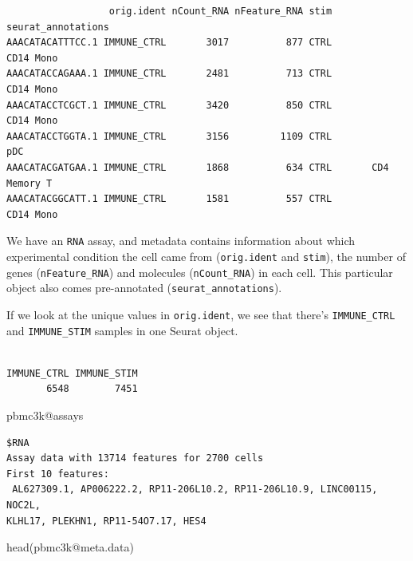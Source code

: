 \documentclass[
  letterpaper,
  DIV=11,
  numbers=noendperiod]{scrreprt}
\newenvironment{Shaded}{\begin{snugshade}}{\end{snugshade}}
\newcommand{\FunctionTok}[1]{\textcolor[rgb]{0.28,0.35,0.67}{#1}}
\newcommand{\NormalTok}[1]{\textcolor[rgb]{0.00,0.23,0.31}{#1}}
\newcommand{\SpecialCharTok}[1]{\textcolor[rgb]{0.37,0.37,0.37}{#1}}
\begin{document}
\begin{verbatim}
                  orig.ident nCount_RNA nFeature_RNA stim seurat_annotations
AAACATACATTTCC.1 IMMUNE_CTRL       3017          877 CTRL          CD14 Mono
AAACATACCAGAAA.1 IMMUNE_CTRL       2481          713 CTRL          CD14 Mono
AAACATACCTCGCT.1 IMMUNE_CTRL       3420          850 CTRL          CD14 Mono
AAACATACCTGGTA.1 IMMUNE_CTRL       3156         1109 CTRL                pDC
AAACATACGATGAA.1 IMMUNE_CTRL       1868          634 CTRL       CD4 Memory T
AAACATACGGCATT.1 IMMUNE_CTRL       1581          557 CTRL          CD14 Mono
\end{verbatim}

We have an \texttt{RNA} assay, and metadata contains information about
which experimental condition the cell came from (\texttt{orig.ident} and
\texttt{stim}), the number of genes (\texttt{nFeature\_RNA}) and
molecules (\texttt{nCount\_RNA}) in each cell. This particular object
also comes pre-annotated (\texttt{seurat\_annotations}).

If we look at the unique values in \texttt{orig.ident}, we see that
there's \texttt{IMMUNE\_CTRL} and \texttt{IMMUNE\_STIM} samples in one
Seurat object.

\begin{Shaded}
\end{Shaded}

\begin{verbatim}

IMMUNE_CTRL IMMUNE_STIM 
       6548        7451 
\end{verbatim}

\begin{Shaded}
\begin{Highlighting}[]
\NormalTok{pbmc3k}\SpecialCharTok{@}\NormalTok{assays}
\end{Highlighting}
\end{Shaded}

\begin{verbatim}
$RNA
Assay data with 13714 features for 2700 cells
First 10 features:
 AL627309.1, AP006222.2, RP11-206L10.2, RP11-206L10.9, LINC00115, NOC2L,
KLHL17, PLEKHN1, RP11-54O7.17, HES4 
\end{verbatim}

\begin{Shaded}
\begin{Highlighting}[]
\FunctionTok{head}\NormalTok{(pbmc3k}\SpecialCharTok{@}\NormalTok{meta.data)}
\end{Highlighting}
\end{Shaded}
\end{document}
